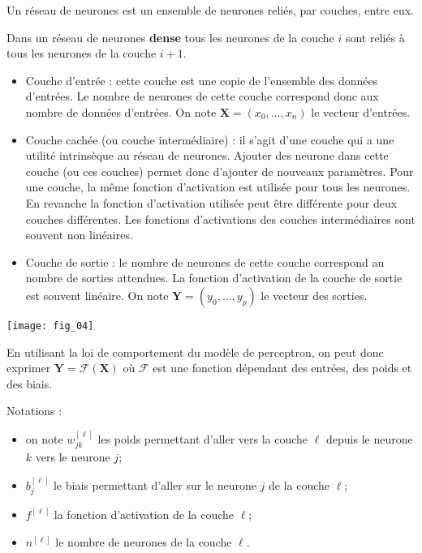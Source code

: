 \begin{defi}[Couches]

Un réseau de neurones est un ensemble de neurones reliés, par couches, entre eux. 

Dans un réseau de neurones \textbf{dense} tous les neurones de la couche $i$ sont reliés à tous les neurones de la couche $i+1$.

\begin{itemize}
\item Couche d'entrée : cette couche est une copie de l'ensemble des données d'entrées. Le nombre de neurones de cette couche correspond donc aux nombre de données d'entrées. On note $\mathbf{X} = \left( x_0, ..., x_n\right)$ le vecteur d'entrées.
\item Couche cachée (ou couche intermédiaire) : il s'agit d'une couche qui a une utilité intrinsèque au réseau de neurones. Ajouter des neurone dans cette couche (ou ces couches) permet donc d'ajouter de nouveaux paramètres.  Pour une couche, la même fonction d'activation est utilisée pour tous les neurones. En revanche la fonction d'activation utilisée peut être différente pour deux couches différentes. Les fonctions d'activations des couches intermédiaires sont souvent non linéaires.
\item Couche de sortie : le nombre de neurones de cette couche correspond au nombre de sorties attendues. La fonction d'activation de la couche de sortie est souvent linéaire. On note $\mathbf{Y} = \left( y_0, ..., y_p\right)$ le vecteur des sorties.
\end{itemize}

\begin{center}
\texttt{[image: fig\_04]}
\end{center}



En utilisant la loi de comportement du modèle de perceptron, on peut donc exprimer $\mathbf{Y}=\mathcal{F}\left(\mathbf{X}\right)$ où $\mathcal{F}$ est une fonction dépendant des entrées, des poids et des biais.


Notations : 
\begin{itemize}
\item on note $w^{[\ell]}_{jk}$ les poids permettant d'aller vers la couche $\ell$ depuis le neurone $k$ vers le neurone $j$;
\item $b^{[\ell]}_{j}$ le biais permettant d'aller sur le neurone $j$ de la couche $\ell$;
\item $f^{[\ell]}$ la fonction d'activation de la couche $\ell$;
\item $n^{[\ell]}$ le nombre de neurones de la couche $\ell$.
\end{itemize}

\end{defi}


